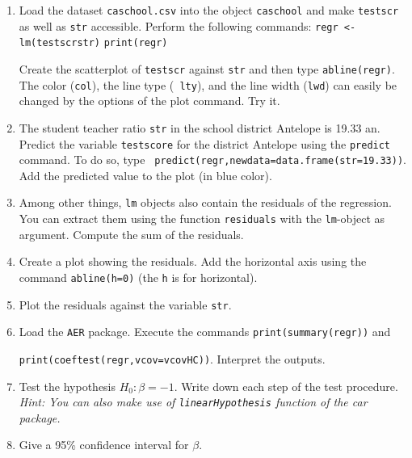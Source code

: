 \documentclass{article}
\begin{document}
\begin{enumerate}
\item Load the dataset \texttt{caschool.csv} into the object \texttt{caschool} and make \texttt{testscr} as well as \texttt{str} accessible. Perform the following
commands:\smallskip \newline
\texttt{regr <- lm(testscrstr)}\newline
\texttt{print(regr)}

Create the scatterplot of \texttt{testscr} against \texttt{str} and then
type \texttt{abline(regr)}. The color (\texttt{col}), the line type (\texttt{%
lty}), and the line width (\texttt{lwd}) can easily be changed by the
options of the plot command. Try it.

\item The student teacher ratio \texttt{str} in the school district Antelope
is 19.33 an. Predict the variable \texttt{testscore} for the district
Antelope using the \texttt{predict} command. To do so, type \texttt{%
predict(regr,newdata=data.frame(str=19.33))}. Add the predicted value to the
plot (in blue color).

\item Among other things, \texttt{lm} objects also contain the residuals of
the regression. You can extract them using the function \texttt{residuals}
with the \texttt{lm}-object as argument. Compute the sum of the residuals.

\item Create a plot showing the residuals. Add the horizontal axis using the
command \texttt{abline(h=0)} (the \texttt{h} is for horizontal).

\item Plot the residuals against the variable \texttt{str}.

\item Load the \texttt{AER} package. Execute the commands \texttt{print(summary(regr))} and

\texttt{print(coeftest(regr,vcov=vcovHC))}. Interpret the outputs.

\item Test the hypothesis $H_{0}:\beta =-1$. Write down each step of the
test procedure. \emph{Hint: You can also make use of \texttt{linearHypothesis} function of the car package.}

\item Give a 95\% confidence interval for $\beta $.
\end{enumerate}
\end{document}
